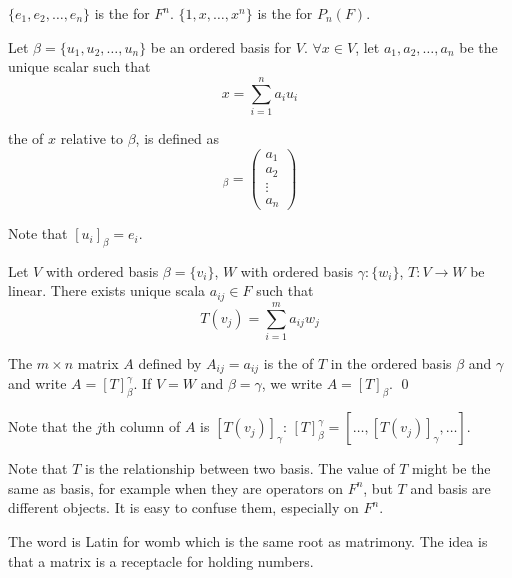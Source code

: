 \begin{definition}
	$\{e_1, e_2, \dots, e_n \}$ is the   for $F^n$. $\{1, x, \dots, x^n \}$ is the   for $P_n (F)$.
\end{definition}

\begin{definition}
	Let $\beta = \{u_1, u_2, \dots, u_n \}$ be an ordered basis for $V$. $\forall x \in V$, let $a_1, a_2, \dots, a_n$ be the unique scalar such that
	\begin{equation*}
		x = \sum_{i=1}^n a_i u_i
	\end{equation*}
	
	the   of $x$ relative to $\beta$, is defined as 
	\begin{equation}
		[x]_\beta = \begin{pmatrix}
		a_1 \\
		a_2 \\
		\vdots \\
		a_n
		\end{pmatrix}
	\end{equation}
	
	Note that $[u_i]_\beta = e_i$.
\end{definition}

\begin{definition}
	Let $V$ with ordered basis $\beta=\{ v_i \}$, $W$ with ordered basis $\gamma:\{w_i\}$, $T:V \rightarrow W$ be linear. There exists unique scala $a_{ij} \in F$ such that
	\begin{equation}
		T(v_j) = \sum_{i=1}^m a_{ij} w_j
	\end{equation}
	
	The $m \times n$ matrix $A$ defined by $A_{ij}=a_{ij}$ is the   of $T$ in the ordered basis $\beta$ and $\gamma$ and write $A=[T]_\beta^\gamma$. If $V = W$ and $\beta = \gamma$, we write $A=[T]_\beta$.
	\qed
\end{definition}

	Note that the $j$th column of $A$ is $[T(v_j)]_\gamma$: $[T]_\beta^\gamma = \left[\dots, [T(v_j)]_\gamma, \dots \right]$.
	
	Note that $T$ is the relationship between two basis. The value of $T$ might be the same as basis, for example when they are operators on $F^n$, but $T$ and basis are different objects. It is easy to confuse them, especially on $F^n$.
	

\begin{definition}
  The word  is Latin for womb which is the same root as matrimony. The idea is that a matrix is a receptacle for holding numbers.   
\end{definition}



